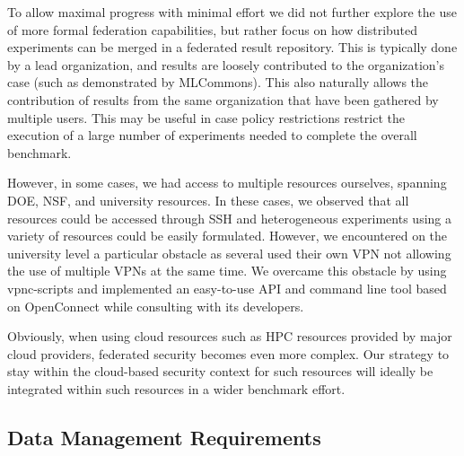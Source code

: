 \documentclass[utf8]{FrontiersinVancouver} %
\begin{document}
To allow maximal progress with minimal effort we did not further explore the use of more formal federation capabilities, but rather focus on how distributed experiments can be merged in a federated result repository. This is typically done by a lead organization, and results are loosely contributed to the organization's case (such as demonstrated by MLCommons). This also naturally allows the contribution of results from the same organization that have been gathered by multiple users. This may be useful in case policy restrictions restrict the execution of a large number of experiments needed to complete the overall benchmark.

However, in some cases, we had access to multiple resources ourselves, spanning DOE, NSF, and university resources. In these cases, we observed that all resources could be accessed through SSH and heterogeneous experiments using a variety of resources could be easily formulated. However, we encountered on the university level a particular obstacle as several used their own VPN not allowing the use of multiple VPNs at the same time. We overcame this obstacle by using vpnc-scripts and implemented an easy-to-use API and command line tool based on OpenConnect while consulting with its developers. 

Obviously, when using cloud resources such as HPC resources provided by major cloud providers, federated security becomes even more complex. Our strategy to stay within the cloud-based security context for such resources will ideally be integrated within such resources in a wider benchmark effort.



\subsection{Data Management Requirements}
\label{sec:data-requirements}
\end{document}
